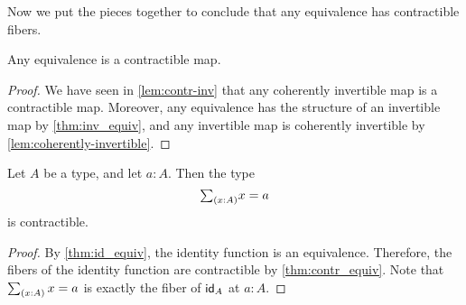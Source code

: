 Now we put the pieces together to conclude that any equivalence has contractible fibers.

\begin{thm}\label{thm:contr_equiv}
Any equivalence is a contractible map.
\end{thm}

\begin{proof}
  We have seen in \cref{lem:contr-inv} that any coherently invertible map is a contractible map. Moreover, any equivalence has the structure of an invertible map by \cref{thm:inv_equiv}, and any invertible map is coherently invertible by \cref{lem:coherently-invertible}.
\end{proof}

\begin{cor}\label{cor:contr_path}
Let $A$ be a type, and let $a:A$. Then the type
\begin{equation*}
\sm{x:A}x=a
\end{equation*}
is contractible.
\end{cor}

\begin{proof}
By \cref{thm:id_equiv}, the identity function is an equivalence. Therefore, the fibers of the identity function are contractible by \cref{thm:contr_equiv}. Note that $\sm{x:A}x=a$ is exactly the fiber of $\idfunc[A]$ at $a:A$.
\end{proof}

\begin{comment}
\begin{proof}
We have the term $(a,\refl{a}):\sm{x:A}a=x$, which we take for the center of contraction. To construct the contraction, we have to show that
\begin{equation*}
\prd{p:\sm{x:A}a=x} (a,\refl{a})=p.
\end{equation*}
By the induction principle for dependent pair types it suffices to construct a term of type
\begin{equation*}
\prd{x:A}{p:a=x} (a,\refl{a})=(x,p)
\end{equation*}
Note that we may proceed here by path induction on $p$. That is, it suffices to consider the case $p\jdeq\refl{a}$, and show that $(a,\refl{a})=(a,\refl{a})$. Here we choose $\refl{(a,\refl{a})}$.
\end{proof}
\end{comment}

